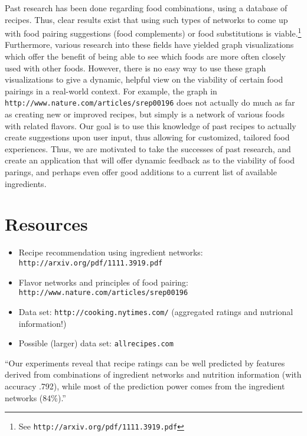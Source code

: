 Past research has been done regarding food combinations, using a database of recipes. Thus, clear results exist that using such types of networks to come up with food pairing suggestions (food complements) or food substitutions is viable.\footnote{See \texttt{http://arxiv.org/pdf/1111.3919.pdf}} Furthermore, various research into these fields have yielded graph visualizations which offer the benefit of being able to see which foods are more often closely used with other foods. However, there is no easy way to use these graph visualizations to give a dynamic, helpful view on the viability of certain food pairings in a real-world context. For example, the graph in \texttt{http://www.nature.com/articles/srep00196}  does not actually do much as far as creating new or improved recipes, but simply is a network of various foods with related flavors. Our goal is to use this knowledge of past recipes to actually create suggestions upon user input, thus allowing for customized, tailored food experiences. Thus, we are motivated to take the successes of past research, and create an application that will offer dynamic feedback as to the viability of food parings, and perhaps even offer good additions to a current list of available ingredients. 



\section{Resources}

\begin{itemize}
\item Recipe recommendation using ingredient networks: \texttt{http://arxiv.org/pdf/1111.3919.pdf}
\item Flavor networks and principles of food pairing: \texttt{http://www.nature.com/articles/srep00196}
\item Data set: \texttt{http://cooking.nytimes.com/} (aggregated ratings and nutrional information!)
\item Possible (larger) data set: \texttt{allrecipes.com}
\end{itemize}

``Our experiments reveal that recipe ratings can be well predicted by features derived from combinations of ingredient networks and nutrition information (with accuracy .792), while most of the prediction power comes from the ingredient networks (84\%).''


